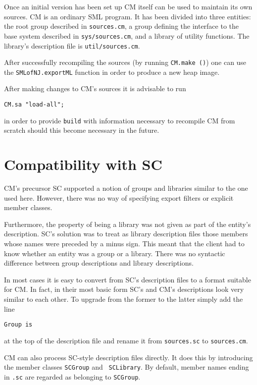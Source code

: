 \documentclass{article}
\begin{document}
Once an initial version has been set up CM itself can be used
to maintain its own sources.  CM is an ordinary SML program.
It has been divided into three entities: the root group described in
{\tt sources.cm}, a group defining the interface to the base system
described in {\tt sys/sources.cm}, and a library of utility functions.
The library's description file is {\tt util/sources.cm}.

After successfully recompiling the sources (by running {\tt CM.make
()}) one can use the {\tt SMLofNJ.exportML} function in order to produce a
new heap image.

After making changes to CM's sources it is advisable to run
\begin{verbatim}
CM.sa "load-all";
\end{verbatim}
in order to provide {\tt build} with information necessary to recompile
CM from scratch should this become necessary in the future.

\section{Compatibility with SC}

CM's precursor SC supported a notion of groups and
libraries similar to the one used here.  However, there was no way of
specifying export filters or explicit member classes.

Furthermore, the property of being a library was not given as part of
the entity's description.  SC's solution was to treat as
library description files those members whose names were preceded by a
minus sign.  This meant that the client had to know whether an entity
was a group or a library.  There was no syntactic difference between
group descriptions and library descriptions.

In most cases it is easy to convert from SC's description
files to a format suitable for CM.  In fact, in their most basic
form SC's and CM's descriptions look very similar to
each other.  To upgrade from the former to the latter simply add the
line
\begin{verbatim}
Group is
\end{verbatim}
at the top of the description file and rename it from {\tt sources.sc}
to {\tt sources.cm}.

CM can also process SC-style description files directly.
It does this by introducing the member classes {\tt SCGroup} and {\tt
SCLibrary}.  By default, member names ending in {\tt .sc} are regarded
as belonging to {\tt SCGroup}.
\end{document}
